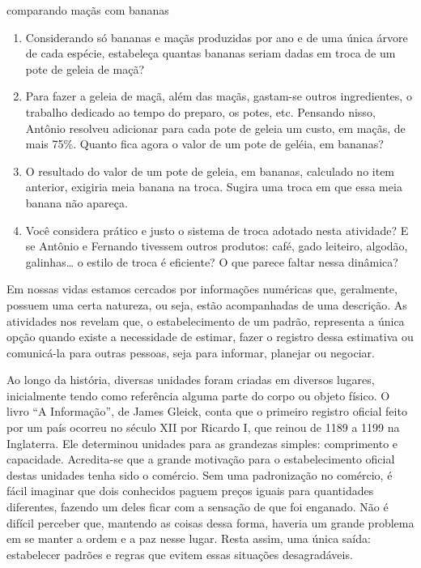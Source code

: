 \begin{task}{comparando maçãs com bananas}
\begin{enumerate}
\item {} 
Considerando só bananas e maçãs produzidas por ano e de uma única árvore de cada espécie, estabeleça quantas bananas seriam dadas em troca de um pote de geleia de maçã?

\item {} 
Para fazer a geleia de maçã, além das maçãs, gastam-se outros ingredientes, o trabalho dedicado ao tempo do preparo, os potes, etc. Pensando nisso, Antônio resolveu adicionar para cada pote de geleia um custo, em maçãs, de mais 75\%. Quanto fica agora o valor de um pote de geléia, em bananas?

\item {} 
O resultado do valor de um pote de geleia, em bananas, calculado no item anterior, exigiria meia banana na troca. Sugira uma troca em que essa meia banana não apareça.

\item {} 
Você considera prático e justo o sistema de troca adotado nesta atividade? E se Antônio e Fernando tivessem outros produtos: café, gado leiteiro, algodão, galinhas… o estilo de troca é eficiente? O que parece faltar nessa dinâmica?

\end{enumerate}
\end{task}

\label{\detokenize{NO103-0:organizando-as-ideias-um-pouco-de-historia}}
Em nossas vidas estamos cercados por informações numéricas que, geralmente, possuem uma certa natureza, ou seja, estão acompanhadas de uma descrição. As atividades nos revelam que, o estabelecimento de um padrão, representa a única opção quando existe a necessidade de estimar, fazer o registro dessa estimativa ou comunicá-la para outras pessoas, seja para informar, planejar ou negociar.

Ao longo da história, diversas unidades foram criadas em diversos lugares, inicialmente tendo como referência alguma parte do corpo ou objeto físico. O livro “A Informação”, de James Gleick, conta que o primeiro registro oficial feito por um país ocorreu no século XII por Ricardo I, que reinou de 1189 a 1199 na Inglaterra. Ele determinou unidades para as grandezas simples: comprimento e  capacidade. Acredita-se que a grande motivação para o estabelecimento oficial destas unidades tenha sido o comércio. Sem uma padronização no comércio, é fácil imaginar que dois conhecidos paguem preços iguais para quantidades diferentes, fazendo um deles ficar com a sensação de que foi enganado. Não é difícil perceber que, mantendo as coisas dessa forma, haveria um grande problema em se manter a ordem e a paz nesse lugar. Resta assim, uma única saída: estabelecer padrões e regras que evitem essas situações desagradáveis.

